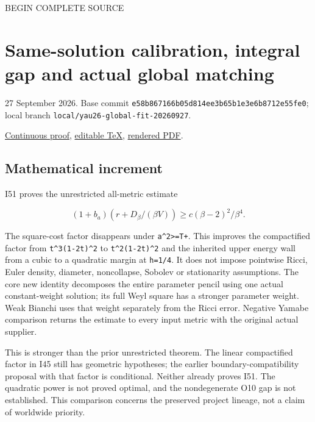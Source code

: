 \documentclass[
  10pt,
]{article}
\begin{document}
BEGIN COMPLETE SOURCE

\hypertarget{same-solution-calibration-integral-gap-and-actual-global-matching}{%
\section{Same-solution calibration, integral gap and actual global
matching}\label{same-solution-calibration-integral-gap-and-actual-global-matching}}

27 September 2026. Base commit
\nolinkurl{e58b867166b05d814ee3b65b1e3e6b8712e55fe0}; local branch
\nolinkurl{local/yau26-global-fit-20260927}.

\href{../continuation/20260927_constant_weight_and_global_fit.md}{Continuous
proof},
\href{../continuation/20260927_constant_weight_and_global_fit.tex}{editable
TeX},
\href{../continuation/20260927_constant_weight_and_global_fit.pdf}{rendered
PDF}.

\hypertarget{mathematical-increment}{%
\subsection{Mathematical increment}\label{mathematical-increment}}

I51 proves the unrestricted all-metric estimate

\[
(1+b_a)(r+D_\beta/(\beta V))\ge c(\beta-2)^2/\beta^4.
\]

The square-cost factor disappears under
\texttt{a\^{}2\textgreater{}=T+}. This improves the compactified factor
from \texttt{t\^{}3(1-2t)\^{}2} to \texttt{t\^{}2(1-2t)\^{}2} and the
inherited upper energy wall from a cubic to a quadratic margin at
\texttt{h=1/4}. It does not impose pointwise Ricci, Euler density,
diameter, noncollapse, Sobolev or stationarity assumptions. The core new
identity decomposes the entire parameter pencil using one actual
constant-weight solution; its full Weyl square has a stronger parameter
weight. Weak Bianchi uses that weight separately from the Ricci error.
Negative Yamabe comparison returns the estimate to every input metric
with the original actual supplier.

This is stronger than the prior unrestricted theorem. The linear
compactified factor in I45 still has geometric hypotheses; the earlier
boundary-compatibility proposal with that factor is conditional. Neither
already proves I51. The quadratic power is not proved optimal, and the
nondegenerate O10 gap is not established. This comparison concerns the
preserved project lineage, not a claim of worldwide priority.
\end{document}
